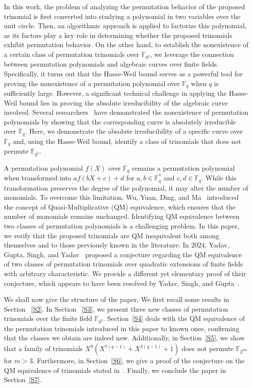\documentclass[12pt,reqno]{amsart}
\numberwithin{equation}{section}
\theoremstyle{definition}
\newcommand{\F}{\mathbb F}
\begin{document}
In this work, the problem of analyzing the permutation behavior of the proposed trinomial is first converted into studying a polynomial in two variables over the unit circle. Then, an algorithmic approach is applied to factorize this polynomial, as its factors play a key role in determining whether the proposed trinomials exhibit permutation behavior. On the other hand, to establish the nonexistence of a certain class of permutation trinomials over $\F_{q^{2}}$, we leverage the connection between permutation polynomials and algebraic curves over finite fields. Specifically, it turns out that the Hasse-Weil bound serves as a powerful tool for proving the nonexistence of a permutation polynomial over $\F_{q}$ when $q$ is sufficiently large. However, a significant technical challenge in applying the Hasse-Weil bound lies in proving the absolute irreducibility of the algebraic curve involved.  Several researchers~\cite{BB, BM, Hou, HC} have demonstrated the nonexistence of permutation polynomials by showing that the corresponding curve is absolutely irreducible over $\F_{q}$. Here, we demonstrate the absolute irreducibility of a specific curve over $\F_q$ and, using the Hasse-Weil bound, identify a class of trinomials that does not permute $\F_{q^2}$.

A permutation polynomial $f(X)$ over $\mathbb{F}_{q}$ remains a permutation polynomial when transformed into $af(bX + c) + d$ for $a,b\in\F_{q}^{*}$ and $c,d\in\F_{q}$. While this transformation preserves the degree of the polynomial, it may alter the number of monomials. To overcome this limitation, Wu, Yuan, Ding, and Ma~\cite{wu2017permutation} introduced the concept of Quasi-Multiplicative (QM) equivalence, which ensures that the number of monomials remains unchanged. Identifying QM equivalence between two classes of permutation polynomials is a challenging problem. In this paper, we verify that the proposed trinomials are QM inequivalent both among themselves and to those previously known in the literature.  In 2024, Yadav, Gupta, Singh, and Yadav~\cite{Harsh} proposed a conjecture regarding the QM equivalence of two classes of permutation trinomials over quadratic extensions of finite fields with arbitrary characteristic. We provide a different yet elementary proof of their conjecture, which appears to have been resolved by Yadav, Singh, and Gupta~\cite{Yadav}.

We shall now give the structure of the paper. We first recall some results in Section ~\ref{S2}. In Section ~\ref{S3}, we present three new classes of permutation trinomials over the finite field $\F_{q^{2}}$. Section~\ref{S4} deals with the QM equivalence of the permutation trinomials introduced in this paper to known ones, confirming that the classes we obtain are indeed new. Additionally, in Section~\ref{S5}, we show that a family of trinomials $X^{9}(X^{7(q-1)}+X^{3(q-1)}+1)$ does not permute $\mathbb{F}_{2^{2m}}$ for $m>3$. Furthermore, in Section~\ref{S6}, we give a proof of the conjecture on the QM equivalence of trinomials stated in~\cite{Harsh}. Finally, we conclude the paper in Section~\ref{S7}.
\end{document}
